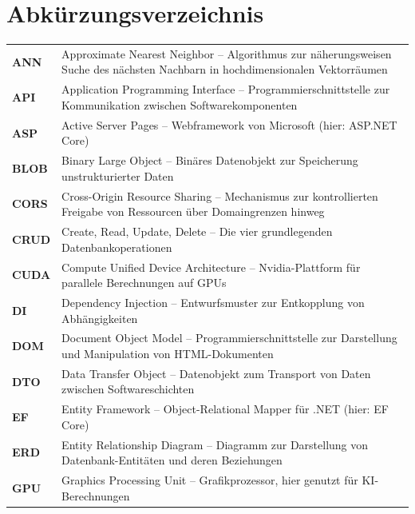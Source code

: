 
\chapter{Abkürzungsverzeichnis}

\begin{longtable}{@{}p{3.5cm}p{12cm}@{}}

\textbf{ANN}    & Approximate Nearest Neighbor -- Algorithmus zur näherungsweisen Suche des nächsten Nachbarn in hochdimensionalen Vektorräumen \\[4pt]
\textbf{API}    & Application Programming Interface -- Programmierschnittstelle zur Kommunikation zwischen Softwarekomponenten \\[4pt]
\textbf{ASP}    & Active Server Pages -- Webframework von Microsoft (hier: ASP.NET Core) \\[4pt]
\textbf{BLOB}   & Binary Large Object -- Binäres Datenobjekt zur Speicherung unstrukturierter Daten \\[4pt]
\textbf{CORS}   & Cross-Origin Resource Sharing -- Mechanismus zur kontrollierten Freigabe von Ressourcen über Domaingrenzen hinweg \\[4pt]
\textbf{CRUD}   & Create, Read, Update, Delete -- Die vier grundlegenden Datenbankoperationen \\[4pt]
\textbf{CUDA}   & Compute Unified Device Architecture -- Nvidia-Plattform für parallele Berechnungen auf GPUs \\[4pt]
\textbf{DI}     & Dependency Injection -- Entwurfsmuster zur Entkopplung von Abhängigkeiten \\[4pt]
\textbf{DOM}    & Document Object Model -- Programmierschnittstelle zur Darstellung und Manipulation von HTML-Dokumenten \\[4pt]
\textbf{DTO}    & Data Transfer Object -- Datenobjekt zum Transport von Daten zwischen Softwareschichten \\[4pt]
\textbf{EF}     & Entity Framework -- Object-Relational Mapper für .NET (hier: EF Core) \\[4pt]
\textbf{ERD}    & Entity Relationship Diagram -- Diagramm zur Darstellung von Datenbank-Entitäten und deren Beziehungen \\[4pt]
\textbf{GPU}    & Graphics Processing Unit -- Grafikprozessor, hier genutzt für KI-Berechnungen \\[4pt]

\end{longtable}
